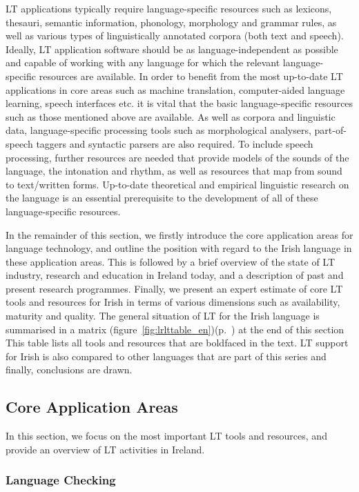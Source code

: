 \begin{multicols}{2}
LT applications typically require language-specific resources such as lexicons, thesauri, semantic information, phonology, morphology and grammar rules, as well as various types of linguistically annotated corpora (both text and speech). Ideally, LT application software should be as language-independent as possible and capable of working with any language for which the relevant language-specific resources are available. In order to benefit from the most up-to-date LT applications in core areas such as machine translation, computer-aided language learning, speech  interfaces etc. it is vital that the basic language-specific resources such as those mentioned above are available. As well as corpora and linguistic data, language-specific processing tools such as morphological analysers, part-of-speech taggers and syntactic parsers  are also required. To include speech processing, further resources are needed that provide models of the sounds of the language, the intonation and rhythm, as well as resources that map from sound to text/written forms. Up-to-date theoretical and empirical linguistic research on the language is an essential prerequisite to the development of all of these language-specific resources.


In the remainder of this section, we firstly introduce the core application areas for language technology, and outline the position with regard to the Irish language in these application areas. This is followed by a brief overview of the state of LT industry, research and education in Ireland today, and a description of past and present research programmes. Finally, we present an expert estimate of core LT tools and resources for Irish in terms of various dimensions such as availability, maturity and quality. The general situation of LT for the Irish language is summarised in a matrix (figure~\ref{fig:lrlttable_en})(p.~\pageref{fig:lrlttable_en}) at the end of this section This table lists all tools and resources that are boldfaced in the text. LT support for Irish is also compared to other languages that are part of this series and finally, conclusions are drawn.

\subsection{Core Application Areas}

In this section, we focus on the most important LT tools and resources, and provide an overview of LT activities in Ireland.

\subsubsection{Language Checking}


\end{multicols}
